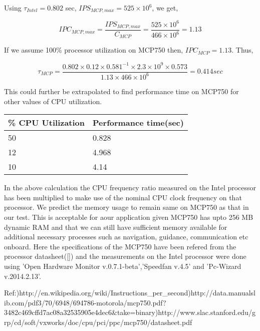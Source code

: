 \documentclass{article}
\begin{document}
	Using $\tau_{Intel} = 0.802$ sec, $IPS_{MCP,max} = 525\times 10^{6}$, we get,
	
	
	\begin{equation}
	IPC_{MCP,max} = \frac{IPS_{MCP,max}}{C_{MCP}} = \frac{525\times 10^{6}}{466\times 10^{6}}= 1.13
	\end{equation}

	If we assume 100\% processor utilization on MCP750 then, $IPC_{MCP} = 1.13.$ Thus,
	
	\begin{equation}
	\tau_{MCP}=\frac{0.802 \times 0.12 \times 0.581^{-1} \times 2.3 \times 10^{9} \times 0.573}{1.13 \times 466\times 10^{6}} = 0.414 sec
	\end{equation}\newline
	
	This could further be extrapolated to find performance time on MCP750 for other values of CPU utilization.\newline
	
	\begin{table}[h]
		\centering
		
		\begin{tabular}{ |l|l| }
			\hline
			\% CPU Utilization & Performance time(sec)\\ \hline
			50 & 0.828 \\ \hline
			12 & 4.968 \\ \hline
			10 & 4.14 \\
			\hline
		\end{tabular}
	\end{table}
	
	In the above calculation the CPU frequency ratio measured on the Intel processor has been multiplied to make use of the nominal CPU clock frequency on that processor. We predict the memory usage to remain same on MCP750 as that in our test.  This is acceptable for aour application given MCP750 has upto 256 MB dynamic RAM and that we can still have sufficient memory available for additional necessary processes such as navigation, guidance, communication etc onboard. Here the specifications of the MCP750 have been refered from the processor datasheet(\ref{}) and the measurements on the Intel processor were done using 'Open Hardware Monitor v.0.7.1-beta','Speedfan v.4.5' and 'Pc-Wizard v.2014.2.13'.\newline
	
	Ref:)http://en.wikipedia.org/wiki/Instructions\_per\_second)http://data.manualslib.com/pdf3/70/6948/694786-motorola/mcp750.pdf?\newline3482c469cffd7ac08a32535905e4dec6\&take=binary)http://www.slac.stanford.edu/grp/cd/soft/vxworks/doc/cpu/pci/ppc/mcp750/datasheet.pdf
	
\end{document}
